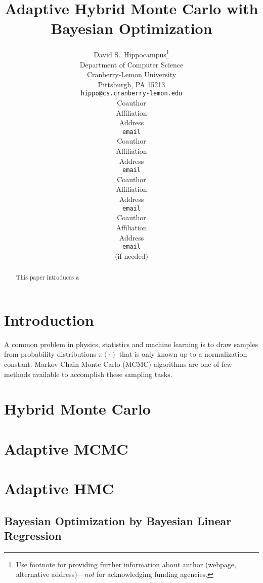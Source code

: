 \documentclass{article} %
\title{Adaptive Hybrid Monte Carlo with Bayesian Optimization}
\author{
David S.~Hippocampus\thanks{ Use footnote for providing further information
about author (webpage, alternative address)---\emph{not} for acknowledging
funding agencies.} \\
Department of Computer Science\\
Cranberry-Lemon University\\
Pittsburgh, PA 15213 \\
\texttt{hippo@cs.cranberry-lemon.edu} \\
\And
Coauthor \\
Affiliation \\
Address \\
\texttt{email} \\
\AND
Coauthor \\
Affiliation \\
Address \\
\texttt{email} \\
\And
Coauthor \\
Affiliation \\
Address \\
\texttt{email} \\
\And
Coauthor \\
Affiliation \\
Address \\
\texttt{email} \\
(if needed)\\
}
\begin{document}
\maketitle

\begin{abstract}
This paper introduces a 
\end{abstract}

\section{Introduction}

A common problem in physics, statistics and machine learning is to draw samples from probability distributions $\pi(\cdot)$ that is only known up to a normalization constant. Markov Chain Monte Carlo (MCMC) algorithms \cite{robert2004monte} are one of few methods available to accomplish these sampling tasks.




\section{Hybrid Monte Carlo}

\section{Adaptive MCMC}

\section{Adaptive HMC}

\subsection{Bayesian Optimization by Bayesian Linear Regression}



\small{
{}

}
\end{document}
